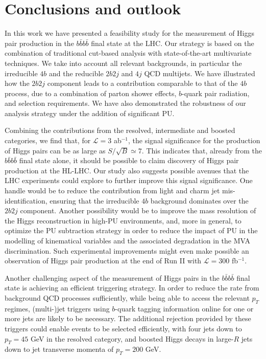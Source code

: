 \section{Conclusions and outlook}
\label{sec:conclusions}

In this work we have presented a feasibility study for
 the measurement of Higgs pair production in the $b\bar{b}b\bar{b}$
final state at the LHC.
%
Our strategy is based on the combination of traditional
cut-based analysis with state-of-the-art multivariate techniques.
%
We take into account 
all relevant backgrounds, in particular
the irreducible $4b$
and the reducible 
$2b2j$ and $4j$ QCD multijets.
%
We have illustrated how the $2b2j$ component leads to
a contribution comparable to that of the $4b$ process,
due to a combination of  parton shower effects, $b$-quark 
pair radiation, and selection requirements.
%
We have also demonstrated the robustness of our analysis strategy
under the addition of significant PU.

Combining the contributions from the resolved,
intermediate and boosted categories, we find that, for
$\mathcal{L}=3$ ab$^{-1}$, the
signal significance for
the production of Higgs pairs can be as large as $S/\sqrt{B}\simeq 7$.
%
This indicates that, already from the $b\bar{b}b\bar{b}$
final state alone,
it should be possible to claim discovery of Higgs pair production at
the HL-LHC.
%
Our study also suggests possible avenues that the LHC experiments
could explore to further improve this signal significance.
%
One handle would be to reduce the contribution from light and charm
jet mis-identification, ensuring that the irreducible $4b$ background 
 dominates over the $2b2j$ component.
%
Another possibility would be to improve the mass resolution of the Higgs
reconstruction
in high-PU environments, and, more in general,
to optimize the PU subtraction
strategy in order
to reduce the impact of PU in the modelling
of kinematical variables and the associated
degradation in the MVA discrimination.
%
Such experimental improvements might
even make possible
an observation of Higgs pair production at the
end of Run II with
$\mathcal{L}=300$ fb$^{-1}$.

Another challenging aspect of the measurement of Higgs pairs
in the $b\bar{b}b\bar{b}$ final state is achieving an efficient
triggering strategy.
%
In order to reduce the rate from background QCD processes sufficiently, while
being able
to access the relevant $p_T$ regimes, (multi-)jet triggers
using $b$-quark tagging information online for one or more jets are
likely to be
necessary.
%
The additional rejection provided by these triggers could
enable events to be selected efficiently, with four
jets down to $p_T=45$ GeV in the resolved category,
and boosted Higgs decays in large-$R$ jets down to jet transverse momenta of
$p_T=200$ GeV.

